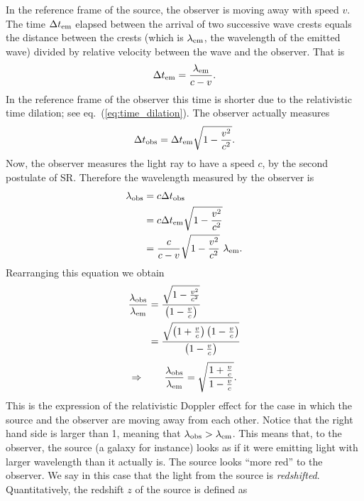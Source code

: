 \documentclass[11pt, a4paper,oneside,openright]{book}
\numberwithin{equation}{section}
\begin{document}
In the reference frame of the source, the observer is moving away with speed $v$. The time $\Delta t_{\rm em}$ elapsed between the arrival of two successive wave crests equals the distance between the crests (which is $\lambda_{\rm em}$, the wavelength of the emitted wave) divided by relative velocity between the wave and the observer. That is
\begin{equation}
\Delta t_{\rm em}=\frac{\lambda_{\rm em}}{c-v}.
\end{equation}
In the reference frame of the observer this time is shorter due to the relativistic time dilation; see eq.\ (\ref{eq:time_dilation}). The observer actually measures
\begin{equation}
\Delta t_{\rm obs}=\Delta t_{\rm em}\sqrt{1-\frac{v^2}{c^2}}.
\end{equation}
Now, the observer measures the light ray to have a speed $c$, by the second postulate of SR. Therefore the wavelength measured by the observer is
\begin{equation}
\begin{split}
\lambda_{\rm obs}&=c\Delta t_{\rm obs}\\
&=c\Delta t_{\rm em}\sqrt{1-\frac{v^2}{c^2}}\\
&=\frac{c}{c-v}\sqrt{1-\frac{v^2}{c^2}}~\lambda_{\rm em}.
\end{split}
\end{equation}
Rearranging this equation we obtain
\begin{equation}
\begin{split}
\frac{\lambda_{\rm obs}}{\lambda_{\rm em}}&=\frac{\sqrt{1-\frac{v^2}{c^2}}}{\left(1-\frac{v}{c}\right)}\\
&=\frac{\sqrt{\left(1+\frac{v}{c}\right)\left(1-\frac{v}{c}\right)}}{\left(1-\frac{v}{c}\right)}\\
\end{split}
\end{equation}
\begin{equation}
\Rightarrow~~~~~~\frac{\lambda_{\rm obs}}{\lambda_{\rm em}}= \sqrt{\frac{1+\frac{v}{c}}{1-\frac{v}{c}}}.
\end{equation}
This is the expression of the relativistic Doppler effect for the case in which the source and the observer are moving away from each other. Notice that the right hand side is larger than 1, meaning that $\lambda_{\rm obs}>\lambda_{\rm em}$. This means that, to the observer, the source (a galaxy for instance) looks as if it were emitting light with larger wavelength than it actually is. The source looks ``more red'' to the observer. We say in this case that the light from the source is {\it redshifted}. Quantitatively, the redshift $z$ of the source is defined as
\end{document}
